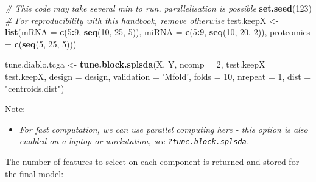 \documentclass[]{book}
\newenvironment{Shaded}{\begin{snugshade}}{\end{snugshade}}
\newcommand{\CommentTok}[1]{\textcolor[rgb]{0.56,0.35,0.01}{\textit{#1}}}
\newcommand{\DataTypeTok}[1]{\textcolor[rgb]{0.13,0.29,0.53}{#1}}
\newcommand{\DecValTok}[1]{\textcolor[rgb]{0.00,0.00,0.81}{#1}}
\newcommand{\KeywordTok}[1]{\textcolor[rgb]{0.13,0.29,0.53}{\textbf{#1}}}
\newcommand{\NormalTok}[1]{#1}
\newcommand{\OperatorTok}[1]{\textcolor[rgb]{0.81,0.36,0.00}{\textbf{#1}}}
\newcommand{\StringTok}[1]{\textcolor[rgb]{0.31,0.60,0.02}{#1}}
\providecommand{\tightlist}{%
  \setlength{\itemsep}{0pt}\setlength{\parskip}{0pt}}
\begin{document}
\begin{Shaded}
\begin{Highlighting}[]
\CommentTok{# This code may take several min to run, parallelisation is possible}
\KeywordTok{set.seed}\NormalTok{(}\DecValTok{123}\NormalTok{) }\CommentTok{# For reproducibility with this handbook, remove otherwise}
\NormalTok{test.keepX <-}\StringTok{ }\KeywordTok{list}\NormalTok{(}\DataTypeTok{mRNA =} \KeywordTok{c}\NormalTok{(}\DecValTok{5}\OperatorTok{:}\DecValTok{9}\NormalTok{, }\KeywordTok{seq}\NormalTok{(}\DecValTok{10}\NormalTok{, }\DecValTok{25}\NormalTok{, }\DecValTok{5}\NormalTok{)),}
                   \DataTypeTok{miRNA =} \KeywordTok{c}\NormalTok{(}\DecValTok{5}\OperatorTok{:}\DecValTok{9}\NormalTok{, }\KeywordTok{seq}\NormalTok{(}\DecValTok{10}\NormalTok{, }\DecValTok{20}\NormalTok{, }\DecValTok{2}\NormalTok{)),}
                   \DataTypeTok{proteomics =} \KeywordTok{c}\NormalTok{(}\KeywordTok{seq}\NormalTok{(}\DecValTok{5}\NormalTok{, }\DecValTok{25}\NormalTok{, }\DecValTok{5}\NormalTok{)))}

\NormalTok{tune.diablo.tcga <-}\StringTok{ }\KeywordTok{tune.block.splsda}\NormalTok{(X, Y, }\DataTypeTok{ncomp =} \DecValTok{2}\NormalTok{, }
                              \DataTypeTok{test.keepX =}\NormalTok{ test.keepX, }\DataTypeTok{design =}\NormalTok{ design,}
                              \DataTypeTok{validation =} \StringTok{'Mfold'}\NormalTok{, }\DataTypeTok{folds =} \DecValTok{10}\NormalTok{, }\DataTypeTok{nrepeat =} \DecValTok{1}\NormalTok{, }
                              \DataTypeTok{dist =} \StringTok{"centroids.dist"}\NormalTok{)}
\end{Highlighting}
\end{Shaded}

Note:

\begin{itemize}
\tightlist
\item
  \emph{For fast computation, we can use parallel computing here - this option is also enabled on a laptop or workstation, see \texttt{?tune.block.splsda}.}
\end{itemize}

The number of features to select on each component is returned and stored for the final model:

\begin{Shaded}
\end{Shaded}
\end{document}
